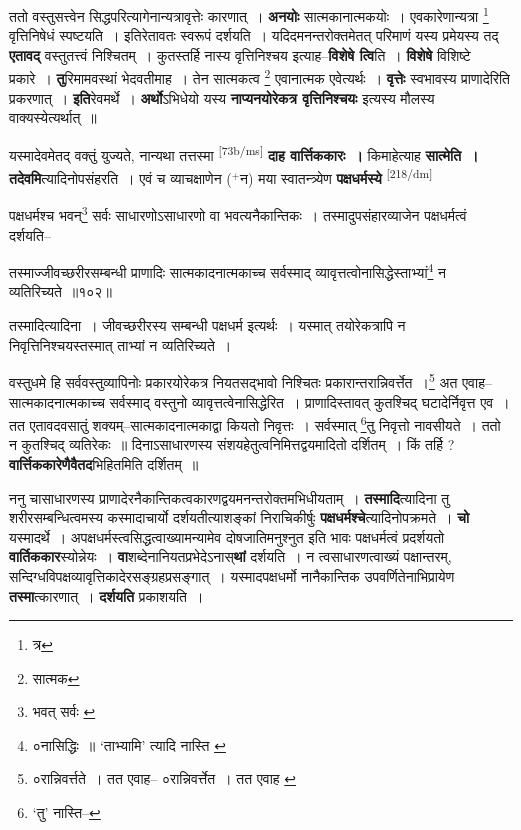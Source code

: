 \documentclass[article,12pt,a4paper]{memoir}
\newcommand{\add}[1]{($^{+}$#1)}
\begin{document}
	  \pstart ततो वस्तुसत्त्वेन सिद्धपरित्यागेनान्यत्रावृत्तेः कारणात् । \textbf{अनयोः} सात्मकानात्मकयोः । एवकारेणान्यत्रा \footnote{त्र} वृत्तिनिषेधं स्पष्टयति । इतिरेतावतः स्वरूपं दर्शयति । यदिदमनन्तरोक्तमेतत् परिमाणं यस्य प्रमेयस्य तद् \textbf{एतावद्} वस्तुतत्त्वं निश्चितम् । कुतस्तर्हि नास्य वृत्तिनिश्चय इत्याह--\textbf{विशेषे त्वि}ति । \textbf{विशेषे} विशिष्टे प्रकारे । \textbf{तु}रिमामवस्थां भेदवतीमाह । तेन सात्मकत्व \footnote{सात्मक} एवानात्मक एवेत्यर्थः । \textbf{वृत्तेः} स्वभावस्य प्राणादेरिति प्रकरणात् । \textbf{इति}रेवमर्थे । \textbf{अर्थो}ऽभिधेयो यस्य \textbf{नाप्यनयोरेकत्र वृत्तिनिश्चयः} इत्यस्य मौलस्य वाक्यस्येत्यर्थात् ॥
	\pend
      

	  \pstart यस्मादेवमेतद् वक्तुं युज्यते, नान्यथा तत्तस्मा \leavevmode\textsuperscript{\rmlatinfont\tiny [73b/ms]} \textbf{दाह वार्त्तिककारः ।} किमाहेत्याह \textbf{सात्मेति । तदेवमि}त्यादिनोपसंहरति । एवं च व्याचक्षाणेन \add{न} मया स्वातन्त्र्येण \textbf{पक्षधर्मस्ये}  \leavevmode\textsuperscript{\rmlatinfont\tiny [218/dm]} 
	  
	पक्षधर्मश्च भवन्\footnote{भवत् सर्वः \cite{dp-msA}} सर्वः साधारणोऽसाधारणो वा भवत्यनैकान्तिकः । तस्मादुपसंहारव्याजेन पक्षधर्मत्वं दर्शयति-- 
	  
	तस्माज्जीवच्छरीरसम्बन्धी प्राणादिः सात्मकादनात्मकाच्च सर्वस्माद् व्यावृत्तत्वोनासिद्धेस्ताभ्यां\footnote{०नासिद्धिः ॥ \cite{dp-edE} ‘ताभ्यामि’ त्यादि नास्ति \cite{dp-edE}} न व्यतिरिच्यते ॥१०२॥ 
	  
	तस्मादित्यादिना । जीवच्छरीरस्य सम्बन्धी पक्षधर्म इत्यर्थः । यस्मात् तयोरेकत्रापि न निवृत्तिनिश्चयस्तस्मात् ताभ्यां न व्यतिरिच्यते । 
	  
	वस्तुधमे हि सर्ववस्तुव्यापिनोः प्रकारयोरेकत्र नियतसद्भावो निश्चितः प्रकारान्तरान्निवर्त्तेत ।\footnote{०रान्निवर्त्तते । तत एवाह--\cite{dp-msD} ०रान्निवर्त्तेत । तत एवाह \cite{dp-msC} \cite{dp-msA} \cite{dp-msB} \cite{dp-edP} \cite{dp-edH} \cite{dp-edE} \cite{dp-edN}} अत एवाह--सात्मकादनात्मकाच्च सर्वस्माद् वस्तुनो व्यावृत्तत्वेनासिद्धेरित । प्राणादिस्तावत् कुतश्चिद् घटादेर्निवृत्त एव । तत एतावदवसातुं शक्यम्--सात्मकादनात्मकाद्वा कियतो निवृत्तः । सर्वस्मात् \footnote{‘तु’ नास्ति--\cite{dp-msC}}तु निवृत्तो नावसीयते । ततो न कुतश्चिद् व्यतिरेकः ॥ दिनाऽसाधारणस्य संशयहेतुत्वनिमित्तद्वयमादितो दर्शितम् । किं तर्हि ? \textbf{वार्त्तिककारेणैवैतद}भिहितमिति दर्शितम् ॥
	\pend
      

	  \pstart ननु चासाधारणस्य प्राणादेरनैकान्तिकत्वकारणद्वयमनन्तरोक्तमभिधीयताम् । \textbf{तस्मादि}त्यादिना तु शरीरसम्बन्धित्वमस्य कस्मादाचार्यो दर्शयतीत्याशङ्कां निराचिकीर्षुः \textbf{पक्षधर्मश्चे}त्यादिनोपक्रमते । \textbf{चो} यस्मादर्थे । अपक्षधर्मस्त्वसिद्धत्वाख्यामन्यामेव दोषजातिमनुश्नुत इति भावः पक्षधर्मत्वं प्रदर्शयतो \textbf{वार्तिककार}स्योन्नेयः । \textbf{वा}शब्देनानियतप्रभेदेऽनास्\textbf{थां} दर्शयति । न त्वसाधारणत्वाख्यं पक्षान्तरम्, सन्दिग्धविपक्षव्यावृत्तिकादेरसङ्ग्रहप्रसङ्गात् । यस्मादपक्षधर्मो नानैकान्तिक उपवर्णितेनाभिप्रायेण \textbf{तस्मा}त्कारणात् । \textbf{दर्शयति} प्रकाशयति ।
	\pend
      
\end{document}
